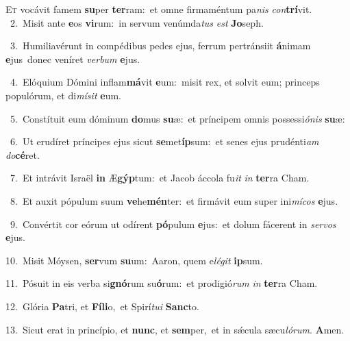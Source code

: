 \lettrine{\initial\textcolor{\initialcolor}{E}}{t} vocávit famem \textbf{su}\-per \textbf{ter}\-ram:~\star et omne firmaméntum pa\textit{nis} \textit{con}\-\textbf{trí}vit.\\
{\numbfont\textcolor{\numbcolor}{~2.}}~Misit ante \textbf{e}\-os \textbf{vi}\-rum:~\star in servum venúmda\textit{tus} \textit{est} \textbf{Jo}\-seph.\par
{\numbfont\textcolor{\numbcolor}{~3.}}~Humiliavérunt in compédibus pedes ejus, ferrum pertránsiit \textbf{á}\-nimam \textbf{e}\-jus~\star donec veníret \textit{ver}\-\textit{bum} \textbf{e}\-jus.\par
{\numbfont\textcolor{\numbcolor}{~4.}}~Elóquium Dómini inflam\-\textbf{má}\-vit \textbf{e}\-um:~\star misit rex, et solvit eum; princeps populórum, et di\-\textit{mí}\-\textit{sit} \textbf{e}\-um.\par
{\numbfont\textcolor{\numbcolor}{~5.}}~Constítuit eum dóminum \textbf{do}\-mus \textbf{su}\-æ:~\star et príncipem omnis possessi\-\textit{ó}\-\textit{nis} \textbf{su}\-æ:\par
{\numbfont\textcolor{\numbcolor}{~6.}}~Ut erudíret príncipes ejus sicut \textbf{se}\-met\-\textbf{íp}\-sum:~\star et senes ejus prudénti\textit{am} \textit{do}\-\textbf{cé}ret.\par
{\numbfont\textcolor{\numbcolor}{~7.}}~Et intrávit Israël \textbf{in} Æ\-\textbf{gýp}\-tum:~\star et Jacob áccola fu\textit{it} \textit{in} \textbf{ter}\-ra Cham.\par
{\numbfont\textcolor{\numbcolor}{~8.}}~Et auxit pópulum suum \textbf{ve}\-he\-\textbf{mén}\-ter:~\star et firmávit eum super ini\-\textit{mí}\-\textit{cos} \textbf{e}\-jus.\par
{\numbfont\textcolor{\numbcolor}{~9.}}~Convértit cor eórum ut odírent \textbf{pó}\-pulum \textbf{e}\-jus:~\star et dolum fácerent in \textit{ser}\-\textit{vos} \textbf{e}\-jus.\par
{\numbfont\textcolor{\numbcolor}{10.}}~Misit Móysen, \textbf{ser}\-vum \textbf{su}\-um:~\star Aaron, quem e\-\textit{lé}\-\textit{git} \textbf{ip}\-sum.\par
{\numbfont\textcolor{\numbcolor}{11.}}~Pósuit in eis verba si\-\textbf{gnó}\-rum su\-\textbf{ó}\-rum:~\star et prodigió\textit{rum} \textit{in} \textbf{ter}\-ra Cham.\par
{\numbfont\textcolor{\numbcolor}{12.}}~Glória \textbf{Pa}\-tri, et \textbf{Fí}\-\textbf{li}o,~\star et Spirí\-\textit{tu}\-\textit{i} \textbf{Sanc}\-to.\par
{\numbfont\textcolor{\numbcolor}{13.}}~Sicut erat in princípio, et \textbf{nunc}\-, et \textbf{sem}\-per,~\star et in sǽcula sæcu\-\textit{ló}\-\textit{rum}. \textbf{A}\-men.\par

